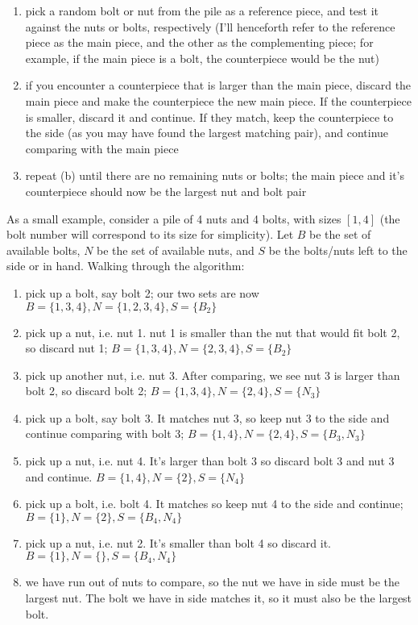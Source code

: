\documentclass[12pt]{article}
\begin{document}
\begin{enumerate}
    \begin{enumerate}
        \item pick a random bolt or nut from the pile as a reference piece, and test it against the nuts or bolts, respectively 
        (I'll henceforth refer to the reference piece as the main piece, and the other as the complementing piece; for example, if the main piece is 
        a bolt, the counterpiece would be the nut)
        \item if you encounter a counterpiece that is larger than the main piece, discard the main piece and make the counterpiece 
        the new main piece. If the counterpiece is smaller, discard it and continue. If they match, keep the counterpiece to the side 
        (as you may have found the largest matching pair), and continue comparing with the main piece
        \item repeat (b) until there are no remaining nuts or bolts; the main piece and it's counterpiece should now be the 
        largest nut and bolt pair
    \end{enumerate}

    As a small example, consider a pile of 4 nuts and 4 bolts, with sizes $[1, 4]$ (the bolt number will correspond to its 
    size for simplicity). Let $B$ be the set of available bolts, $N$ be the set of available nuts, and $S$ be the bolts/nuts 
    left to the side or in hand. Walking through the algorithm:

    \begin{enumerate}
        \item pick up a bolt, say bolt 2; our two sets are now $B = \{1, 3, 4\}, N = \{1, 2, 3, 4\}, S = \{B_2\}$
        \item pick up a nut, i.e. nut 1. nut 1 is smaller than the nut that would fit bolt 2, so discard nut 1; $B = \{1, 3, 4\}, N = \{2, 3, 4\}, S = \{B_2\}$
        \item pick up another nut, i.e. nut 3. After comparing, we see nut 3 is larger than bolt 2, so discard bolt 2; $B = \{1, 3, 4\}, N = \{2, 4\}, S = \{N_3\}$
        \item pick up a bolt, say bolt 3. It matches nut 3, so keep nut 3 to the side and continue comparing with bolt 3; $B = \{1, 4\}, N = \{2, 4\}, S = \{B_3, N_3\}$
        \item pick up a nut, i.e. nut 4. It's larger than bolt 3 so discard bolt 3 and nut 3 and continue. $B = \{1, 4\}, N = \{2\}, S = \{N_4\}$
        \item pick up a bolt, i.e. bolt 4. It matches so keep nut 4 to the side and continue; $B = \{1\}, N = \{2\}, S = \{B_4, N_4\}$
        \item pick up a nut, i.e. nut 2. It's smaller than bolt 4 so discard it. $B = \{1\}, N = \{\}, S = \{B_4, N_4\}$
        \item we have run out of nuts to compare, so the nut we have in side must be the largest nut. The bolt we have in side matches it, 
        so it must also be the largest bolt.
    \end{enumerate}
\end{enumerate}
\end{document}
